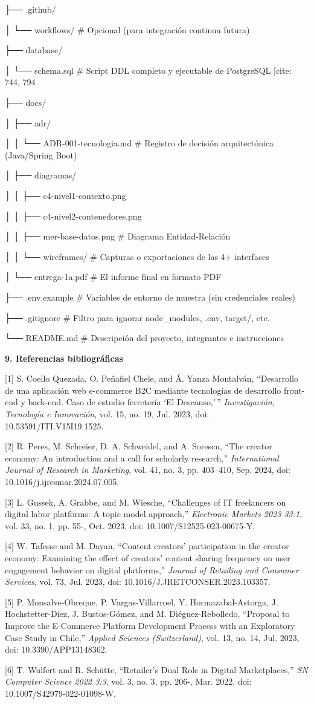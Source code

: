 \documentclass[
]{article}
\begin{document}
├── .github/

│ └── workflows/ \# Opcional (para integración continua futura)

├── database/

│ └── schema.sql \# Script DDL completo y ejecutable de PostgreSQL
{[}cite: 744, 794

├── docs/

│ ├── adr/

│ │ └── ADR-001-tecnologia.md \# Registro de decisión arquitectónica
(Java/Spring Boot)

│ ├── diagramas/

│ │ ├── c4-nivel1-contexto.png

│ │ ├── c4-nivel2-contenedores.png

│ │ ├── mer-base-datos.png \# Diagrama Entidad-Relación

│ │ └── wireframes/ \# Capturas o exportaciones de las 4+ interfaces

│ └── entrega-1a.pdf \# El informe final en formato PDF

├── .env.example \# Variables de entorno de muestra (sin credenciales
reales)

├── .gitignore \# Filtro para ignorar node\_modules, .env, target/, etc.

└── README.md \# Descripción del proyecto, integrantes e instrucciones

\textbf{9. Referencias bibliográficas}

{[}1{]} S. Coello Quezada, O. Peñafiel Chele, and Á. Yanza Montalván,
``Desarrollo de una aplicación web e-commerce B2C mediante tecnologías
de desarrollo front-end y back-end. Caso de estudio ferretería `El
Descanso,'\,'' \emph{Investigación, Tecnología e Innovación}, vol. 15,
no. 19, Jul. 2023, doi: 10.53591/ITI.V15I19.1525.

{[}2{]} R. Peres, M. Schreier, D. A. Schweidel, and A. Sorescu, ``The
creator economy: An introduction and a call for scholarly research,''
\emph{International Journal of Research in Marketing}, vol. 41, no. 3,
pp. 403--410, Sep. 2024, doi: 10.1016/j.ijresmar.2024.07.005.

{[}3{]} L. Gussek, A. Grabbe, and M. Wiesche, ``Challenges of IT
freelancers on digital labor platforms: A topic model approach,''
\emph{Electronic Markets 2023 33:1}, vol. 33, no. 1, pp. 55-, Oct. 2023,
doi: 10.1007/S12525-023-00675-Y.

{[}4{]} W. Tafesse and M. Dayan, ``Content creators' participation in
the creator economy: Examining the effect of creators' content sharing
frequency on user engagement behavior on digital platforms,''
\emph{Journal of Retailing and Consumer Services}, vol. 73, Jul. 2023,
doi: 10.1016/J.JRETCONSER.2023.103357.

{[}5{]} P. Monsalve-Obreque, P. Vargas-Villarroel, Y.
Hormazabal-Astorga, J. Hochstetter-Diez, J. Bustos-Gómez, and M.
Diéguez-Rebolledo, ``Proposal to Improve the E-Commerce Platform
Development Process with an Exploratory Case Study in Chile,''
\emph{Applied Sciences (Switzerland)}, vol. 13, no. 14, Jul. 2023, doi:
10.3390/APP13148362.

{[}6{]} T. Wulfert and R. Schütte, ``Retailer's Dual Role in Digital
Marketplaces,'' \emph{SN Computer Science 2022 3:3}, vol. 3, no. 3, pp.
206-, Mar. 2022, doi: 10.1007/S42979-022-01098-W.
\end{document}
